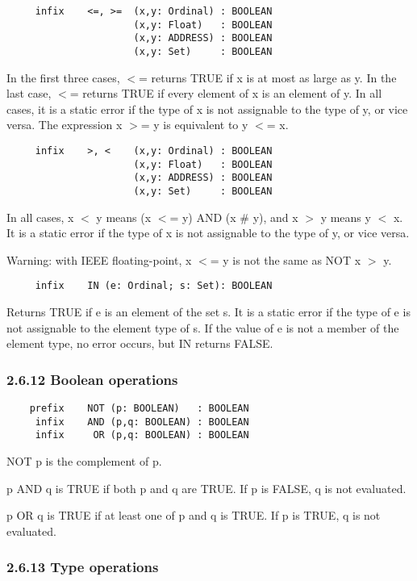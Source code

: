 \documentclass[10pt]{article}
\begin{document}
\begin{verbatim}
     infix    <=, >=  (x,y: Ordinal) : BOOLEAN
                      (x,y: Float)   : BOOLEAN
                      (x,y: ADDRESS) : BOOLEAN
                      (x,y: Set)     : BOOLEAN
\end{verbatim}
In the first three cases, $<$= returns TRUE if x is at most as large as y.  In
the last case, $<$= returns TRUE if every element of x is an element of y.  In
all cases, it is a static error if the type of x is not assignable to the type
of y, or vice versa.  The expression x $>$= y is equivalent to y $<$= x.

\begin{verbatim}
     infix    >, <    (x,y: Ordinal) : BOOLEAN
                      (x,y: Float)   : BOOLEAN
                      (x,y: ADDRESS) : BOOLEAN
                      (x,y: Set)     : BOOLEAN
\end{verbatim}
In all cases, x $<$ y means (x $<$= y) AND (x \# y), and x $>$ y means y $<$
x.  It is a static error if the type of x is not assignable to the type of y,
or vice versa.

Warning: with IEEE floating-point, x $<$= y is not the same as NOT x $>$ y.

\begin{verbatim}
     infix    IN (e: Ordinal; s: Set): BOOLEAN
\end{verbatim}
Returns TRUE if e is an element of the set s.  It is a static error if the type
of e is not assignable to the element type of s.  If the value of e is not a
member of the element type, no error occurs, but IN returns FALSE.

\subsubsection*{2.6.12 Boolean operations}

\begin{verbatim}
    prefix    NOT (p: BOOLEAN)   : BOOLEAN
     infix    AND (p,q: BOOLEAN) : BOOLEAN
     infix     OR (p,q: BOOLEAN) : BOOLEAN
\end{verbatim}
NOT p is the complement of p.

p AND q is TRUE if both p and q are TRUE.  If p is FALSE, q is not evaluated.

p OR q is TRUE if at least one of p and q is TRUE.  If p is TRUE, q is not
evaluated.

\subsubsection*{2.6.13 Type operations}
\end{document}

